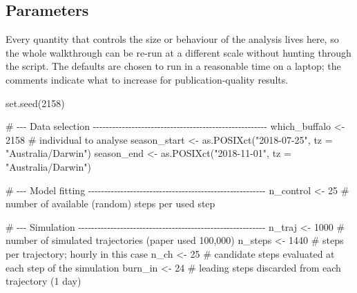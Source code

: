 \documentclass[
  letterpaper,
  DIV=11,
  numbers=noendperiod]{scrartcl}
\newenvironment{Shaded}{\begin{snugshade}}{\end{snugshade}}
\newcommand{\AttributeTok}[1]{\textcolor[rgb]{0.40,0.45,0.13}{#1}}
\newcommand{\CommentTok}[1]{\textcolor[rgb]{0.37,0.37,0.37}{#1}}
\newcommand{\DecValTok}[1]{\textcolor[rgb]{0.68,0.00,0.00}{#1}}
\newcommand{\FunctionTok}[1]{\textcolor[rgb]{0.28,0.35,0.67}{#1}}
\newcommand{\NormalTok}[1]{\textcolor[rgb]{0.00,0.23,0.31}{#1}}
\newcommand{\OtherTok}[1]{\textcolor[rgb]{0.00,0.23,0.31}{#1}}
\newcommand{\StringTok}[1]{\textcolor[rgb]{0.13,0.47,0.30}{#1}}
\begin{document}
\subsection{Parameters}\label{parameters}

Every quantity that controls the size or behaviour of the analysis lives
here, so the whole walkthrough can be re-run at a different scale
without hunting through the script. The defaults are chosen to run in a
reasonable time on a laptop; the comments indicate what to increase for
publication-quality results.

\begin{Shaded}
\begin{Highlighting}[]
\FunctionTok{set.seed}\NormalTok{(}\DecValTok{2158}\NormalTok{)}

\CommentTok{\# {-}{-}{-} Data selection {-}{-}{-}{-}{-}{-}{-}{-}{-}{-}{-}{-}{-}{-}{-}{-}{-}{-}{-}{-}{-}{-}{-}{-}{-}{-}{-}{-}{-}{-}{-}{-}{-}{-}{-}{-}{-}{-}{-}{-}{-}{-}{-}{-}{-}{-}{-}{-}{-}{-}{-}{-}{-}{-}}
\NormalTok{which\_buffalo }\OtherTok{\textless{}{-}} \DecValTok{2158}                                          \CommentTok{\# individual to analyse}
\NormalTok{season\_start  }\OtherTok{\textless{}{-}} \FunctionTok{as.POSIXct}\NormalTok{(}\StringTok{"2018{-}07{-}25"}\NormalTok{, }\AttributeTok{tz =} \StringTok{"Australia/Darwin"}\NormalTok{)}
\NormalTok{season\_end    }\OtherTok{\textless{}{-}} \FunctionTok{as.POSIXct}\NormalTok{(}\StringTok{"2018{-}11{-}01"}\NormalTok{, }\AttributeTok{tz =} \StringTok{"Australia/Darwin"}\NormalTok{)}

\CommentTok{\# {-}{-}{-} Model fitting {-}{-}{-}{-}{-}{-}{-}{-}{-}{-}{-}{-}{-}{-}{-}{-}{-}{-}{-}{-}{-}{-}{-}{-}{-}{-}{-}{-}{-}{-}{-}{-}{-}{-}{-}{-}{-}{-}{-}{-}{-}{-}{-}{-}{-}{-}{-}{-}{-}{-}{-}{-}{-}{-}{-}}
\NormalTok{n\_control }\OtherTok{\textless{}{-}} \DecValTok{25}    \CommentTok{\# number of available (random) steps per used step}

\CommentTok{\# {-}{-}{-} Simulation {-}{-}{-}{-}{-}{-}{-}{-}{-}{-}{-}{-}{-}{-}{-}{-}{-}{-}{-}{-}{-}{-}{-}{-}{-}{-}{-}{-}{-}{-}{-}{-}{-}{-}{-}{-}{-}{-}{-}{-}{-}{-}{-}{-}{-}{-}{-}{-}{-}{-}{-}{-}{-}{-}{-}{-}{-}{-}}
\NormalTok{n\_traj  }\OtherTok{\textless{}{-}} \DecValTok{1000}    \CommentTok{\# number of simulated trajectories (paper used 100,000)}
\NormalTok{n\_steps }\OtherTok{\textless{}{-}} \DecValTok{1440}    \CommentTok{\# steps per trajectory; hourly in this case}
\NormalTok{n\_ch    }\OtherTok{\textless{}{-}} \DecValTok{25}      \CommentTok{\# candidate steps evaluated at each step of the simulation}
\NormalTok{burn\_in }\OtherTok{\textless{}{-}} \DecValTok{24}      \CommentTok{\# leading steps discarded from each trajectory (1 day)}


\end{Highlighting}
\end{Shaded}
\end{document}
